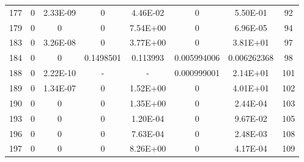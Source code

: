 {\begin{longtable}{cccccccc}
177 & {\color{red}0} & {\color{red}2.33E-09} & {\color{red}0} & {\color{red}4.46E-02} & {\color{red}0} & 5.50E-01 & 92 \\
179 & {\color{red}0} & {\color{red}0} & {\color{red}0} & 7.54E+00 & {\color{red}0} & {\color{red}6.96E-05} & 94 \\
183 & {\color{red}0} & {\color{red}3.26E-08} & {\color{red}0} & 3.77E+00 & {\color{red}0} & 3.81E+01 & 97 \\
184 & {\color{red}0} & {\color{red}0} & 0.1498501 & 0.113993 & {\color{red}0.005994006} & {\color{red}0.006262368} & 98 \\
188 & {\color{red}0} & {\color{red}2.22E-10} & - & - &  {\color{red}0.000999001} & 2.14E+01 & 101 \\
189 & {\color{red}0} & {\color{red}1.34E-07} & {\color{red}0} & 1.52E+00 & {\color{red}0} & 4.01E+01 & 102 \\
190 & {\color{red}0} & {\color{red}0} & {\color{red}0} & 1.35E+00 & {\color{red}0} & {\color{red}2.44E-04} & 103 \\
193 & {\color{red}0} & {\color{red}0} & {\color{red}0} & {\color{red}1.20E-04} & {\color{red}0} & 9.67E-02 & 105 \\
196 & {\color{red}0} & {\color{red}0} & {\color{red}0} & {\color{red}7.63E-04} & {\color{red}0} & {\color{red}2.48E-03} & 108 \\
197 & {\color{red}0} & {\color{red}0} & {\color{red}0} & 8.26E+00 & {\color{red}0} & {\color{red}4.17E-04} & 109 \\ \hline
\end{longtable}
}

